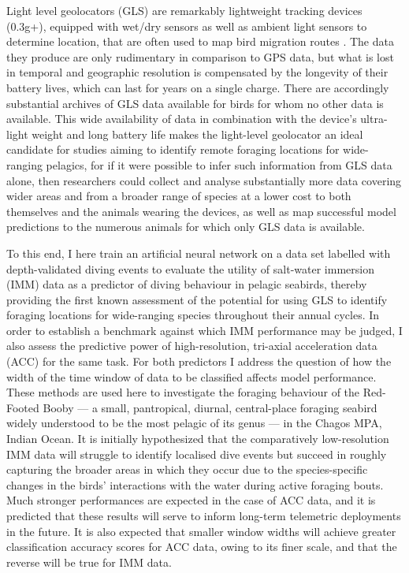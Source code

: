 \documentclass[11pt]{article}
\begin{document}
    Light level geolocators (GLS) are remarkably lightweight tracking devices (0.3g+), equipped with wet/dry sensors as well as ambient light sensors to determine location, that are often used to map bird migration routes \citep{newton2010migration,aakesson2012migration,minton2010initial,bachler2010year,jahn2013long}. 
    The data they produce are only rudimentary in comparison to GPS data, but what is lost in temporal and geographic resolution is compensated by the longevity of their battery lives, which can last for years on a single charge.
    There are accordingly substantial archives of GLS data available for birds for whom no other data is available. This wide availability of data in combination with the device's ultra-light weight and long battery life makes the light-level geolocator an ideal candidate for studies aiming to identify remote foraging locations for wide-ranging pelagics, for if it were possible to infer such information from GLS data alone, then researchers could collect and analyse substantially more data covering wider areas and from a broader range of species at a lower cost to both themselves and the animals wearing the devices, as well as map successful model predictions to the numerous animals for which only GLS data is available. 
    
    To this end, I here train an artificial neural network on a data set labelled with depth-validated diving events to evaluate the utility of salt-water immersion (IMM) data as a predictor of diving behaviour in pelagic seabirds, thereby providing the first known assessment of the potential for using GLS to identify foraging locations for wide-ranging species throughout their annual cycles. In order to establish a benchmark against which IMM performance may be judged, I also assess the predictive power of high-resolution, tri-axial acceleration data (ACC) for the same task. For both predictors I address the question of how the width of the time window of data to be classified affects model performance. These methods are used here to investigate the foraging behaviour of the Red-Footed Booby — a small, pantropical, diurnal, central-place foraging seabird widely understood to be the most pelagic of its genus \citep{nelson1978sulidae,schreiber1996red} — in the Chagos MPA, Indian Ocean. It is initially hypothesized that the comparatively low-resolution IMM data will struggle to identify localised dive events but succeed in roughly capturing the broader areas in which they occur due to the species-specific changes in the birds' interactions with the water during active foraging bouts. Much stronger performances are expected in the case of ACC data, and it is predicted that these results will serve to inform long-term telemetric deployments in the future. It is also expected that smaller window widths will achieve greater classification accuracy scores for ACC data, owing to its finer scale, and that the reverse will be true for IMM data.
    
\end{document}
